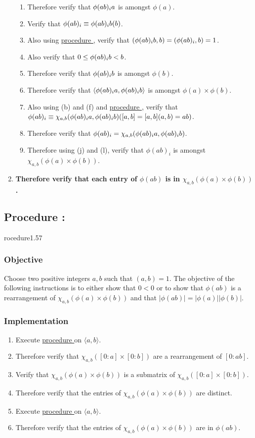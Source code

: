 \documentclass{article}
\let\mod\relax\DeclareMathOperator{\mod}{mod}
\newcounter{procedure}[part]
\newcommand{\procedure}[1]{\subsection*{Procedure \thepart:\theprocedure}\label{sec:procedure #1}\global\expandafter\edef\csname procedure#1\endcsname{\thepart:\theprocedure}\addtocounter{procedure}{1}}
\newcommand{\objective}{\subsubsection*{Objective}}
\newcommand{\implementation}{\subsubsection*{Implementation}}
\newcommand{\procedurehr}[1]{\hyperref[sec:procedure #1]{procedure \expandafter\csname procedure#1\endcsname}}
\begin{document}
\begin{multicols}{2}
\begin{enumerate}
\begin{enumerate}
						\item Therefore verify that $\phi(ab)_i\mod a$ is amongst $\phi(a)$.
						\item Verify that $\phi(ab)_i\equiv\phi(ab)_i\mod b(\mod b)$.
						\item Also using \procedurehr{1.17}, verify that $(\phi(ab)_i\mod b,b)=(\phi(ab)_i,b)=1$.
						\item Also verify that $0\le \phi(ab)_i\mod b<b$.
						\item Therefore verify that $\phi(ab)_i\mod b$ is amongst $\phi(b)$.
						\item Therefore verify that $\langle \phi(ab)_i\mod a,\phi(ab)_i\mod b\rangle$ is amongst $\phi(a)\times\phi(b)$.
						\item Also using (b) and (f) and \procedurehr{1.39}, verify that $\phi(ab)_i\equiv\chi_{a,b}(\phi(ab)_i\mod a,\phi(ab)_i\mod b)(\mod[a,b]=[a,b](a,b)=ab)$.
						\item Therefore verify that $\phi(ab)_i=\chi_{a,b}(\phi(ab)_i\mod a,\phi(ab)_i\mod b)$.
						\item Therefore using (j) and (l), verify that $\phi(ab)_i$ is amongst $\chi_{a,b}(\phi(a)\times\phi(b))$.
					\end{enumerate}
					\item \textbf{Therefore verify that each entry of $\phi(ab)$ is in $\chi_{a,b}(\phi(a)\times\phi(b))$.}
				\end{enumerate}
		\procedure{1.57}
			\objective
				Choose two positive integers $a,b$ such that $(a,b)=1$. The objective of the following instructions is to either show that $0<0$ or to show that $\phi(ab)$ is a rearrangement of $\chi_{a,b}(\phi(a)\times\phi(b))$ and that $\lvert\phi(ab)\rvert=\lvert\phi(a)\rvert\lvert\phi(b)\rvert$.
			\implementation
				\begin{enumerate}
					\item Execute \procedurehr{1.54} on $\langle a,b\rangle$.
					\item Therefore verify that $\chi_{a,b}([0:a]\times[0:b])$ are a rearrangement of $[0:ab]$.
					\item Verify that $\chi_{a,b}(\phi(a)\times\phi(b))$ is a submatrix of $\chi_{a,b}([0:a]\times[0:b])$.
					\item Therefore verify that the entries of $\chi_{a,b}(\phi(a)\times\phi(b))$ are distinct.
					\item Execute \procedurehr{1.55} on $\langle a,b\rangle$.
					\item Therefore verify that the entries of $\chi_{a,b}(\phi(a)\times\phi(b))$ are in $\phi(ab)$.

\end{enumerate}
\end{multicols}
\end{document}
